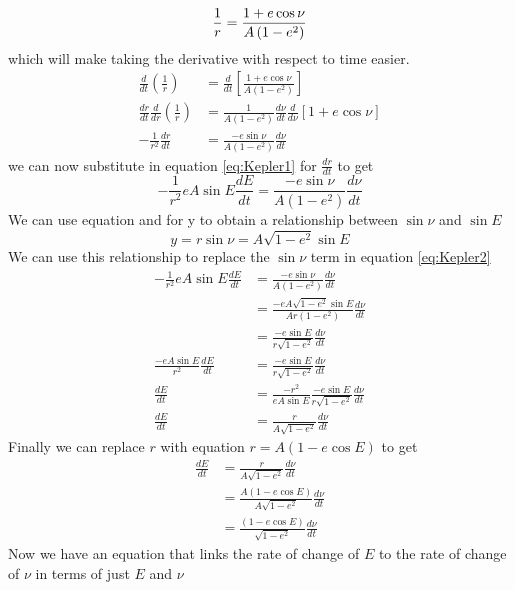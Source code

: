 \begin{equation}
\frac{1}{r}= \frac{ 1+e \cos \nu}{A\left(1-e^2\right)} \\
\end{equation}
which will make taking the derivative with respect to time easier.
\begin{align}
\frac{d}{dt}\left( \frac{1}{r}\right) &= \frac{d}{dt}\left[ \frac{ 1+e \cos \nu}{A\left(1-e^2\right)}\right]\nonumber \\
\frac{dr}{dt}\frac{d}{dr}\left( \frac{1}{r}\right) &= \frac{1}{A(1-e^2)}\frac{d\nu}{dt}\frac{d}{d\nu}\left[  1+e \cos \nu \right]\nonumber \\
-\frac{1}{r^2}\frac{dr}{dt} &= \frac{-e \sin \nu}{A(1-e^2)}\frac{d\nu}{dt}
\end{align}
we can now substitute in equation \ref{eq:Kepler1} for $\frac{dr}{dt}$ to get
\begin{equation}
-\frac{1}{r^2} eA \sin E \frac{dE}{dt}= \frac{-e \sin \nu}{A(1-e^2)}\frac{d\nu}{dt} \label{eq:Kepler2}
\end{equation}
We can use equation  and  for y to obtain a relationship between $\sin \nu$ and $\sin E$
\begin{equation}
y = r \sin \nu = A\sqrt{1-e^2}\sin E
\end{equation}
We can use this relationship to replace the $\sin \nu$ term in equation \ref{eq:Kepler2}
\begin{align}
-\frac{1}{r^2} eA \sin E \frac{dE}{dt}&= \frac{-e \sin \nu}{A(1-e^2)}\frac{d\nu}{dt}\nonumber \\
&= \frac{-e A\sqrt{1-e^2}\sin E}{Ar(1-e^2)}\frac{d\nu}{dt}\nonumber \\
&= \frac{-e \sin E}{r\sqrt{1-e^2}}\frac{d\nu}{dt}\nonumber \\
\frac{-eA \sin E }{r^2} \frac{dE}{dt}&= \frac{-e \sin E}{r\sqrt{1-e^2}}\frac{d\nu}{dt}\nonumber \\
\frac{dE}{dt}&= \frac{-r^2}{eA \sin E } \frac{-e \sin E}{r\sqrt{1-e^2}}\frac{d\nu}{dt}\nonumber \\
\frac{dE}{dt} & = \frac{r}{A\sqrt{1-e^2}}\frac{d\nu}{dt}
\end{align}
Finally we can replace $r$ with equation  $r=A(1-e \cos E)$ to get
\begin{align}
\frac{dE}{dt} & = \frac{r}{A\sqrt{1-e^2}}\frac{d\nu}{dt}\\
 & = \frac{A(1-e\cos E)}{A\sqrt{1-e^2}}\frac{d\nu}{dt}\\
  & = \frac{(1-e\cos E)}{\sqrt{1-e^2}}\frac{d\nu}{dt}\label{eq:Kepler3}
\end{align}
Now we have an equation that links the rate of change of $E$ to the rate of change of $\nu$ in terms of just $E$ and $\nu$

